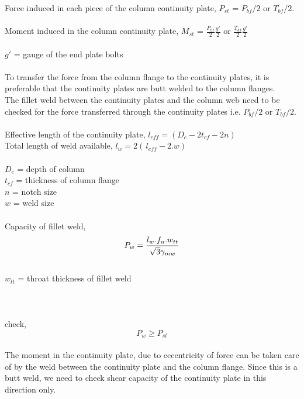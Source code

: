 \documentclass[11.5pt,a4paper,oneside]{report}
\begin{document}
\begin{Form}
\noindent
Force induced in each piece of the column continuity plate, $P_{st}$ = $P_{bf}/2$ \: or \: $T_{bf}/2$.\\
\\
Moment induced in the column continuity plate, $M_{st}$ = $ \frac{P_{bf}} {2}  \frac{g'} {2} $ \: or \: $ \frac{T_{bf}} {2}  \frac{g'} {2} $\\
\\
\indent $g'$ = gauge of the end plate bolts \\ 
\\
\noindent
To transfer the force from the column flange to the continuity plates, it is preferable that the continuity plates are butt welded to the column flanges.
\\
The fillet weld between the continuity plates and the column web need to be checked for the force transferred through the continuity plates i.e. $P_{bf}/2$ \: or \: $T_{bf}/2$.\\
\\
Effective length of the continuity plate, $l_{eff} = ( D_c - 2t_{cf} - 2n )$ \\
Total length of weld available, $l_w = 2(\, l_{eff} - 2.w)$ \\
\\
\indent $D_c$ = depth of column \\ 
\indent $t_{cf}$ = thickness of column flange \\
\indent $n$ = notch size \\
\indent $w$ = weld size \\
\\
Capacity of fillet weld,
\begin{equation}
P_w = \frac{l_w . f_u . w_{tt}}{\sqrt{3} \gamma_{mw}}\\
\end{equation}
\\
\indent $w_{tt}$ = throat thickness of fillet weld\\
\indent [Reference: Cl. 10.5.7 of IS 800: 2007] \\ \\
\\
check, 
\begin{equation}
P_w \ge P_{st}
\end{equation}
\\
The moment in the continuity plate, due to eccentricity of force can be taken care of by the weld between the continuity plate and the column flange. Since this is a butt weld, we need to check shear capacity of the continuity plate in this direction only.

\end{Form}
\end{document}
